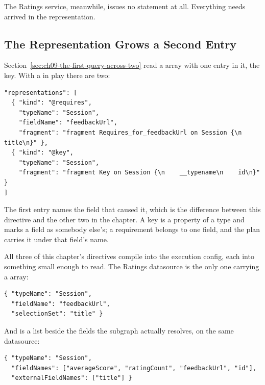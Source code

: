 %
The Ratings service, meanwhile, issues no statement at all. Everything
 needs arrived in the representation.

\subsection{The Representation Grows a Second Entry}

%
Section~\ref{sec:ch09-the-first-query-across-two} read a
 array with one entry in it, the key. With a
 in play there are two:

\begin{verbatim}
"representations": [
  { "kind": "@requires",
    "typeName": "Session",
    "fieldName": "feedbackUrl",
    "fragment": "fragment Requires_for_feedbackUrl on Session {\n    title\n}" },
  { "kind": "@key",
    "typeName": "Session",
    "fragment": "fragment Key on Session {\n    __typename\n    id\n}" }
]
\end{verbatim}

%
The first entry names the field that caused it, which is the difference between
this directive and the other two in the chapter. A key is a property of a type
and  marks a field as somebody else's; a requirement belongs to
one field, and the plan carries it under that field's name.

%
All three of this chapter's directives compile into the execution config, each
into something small enough to read. The Ratings datasource is the only one
carrying a  array:

\begin{verbatim}
{ "typeName": "Session",
  "fieldName": "feedbackUrl",
  "selectionSet": "title" }
\end{verbatim}

%
And  is a list beside the fields the subgraph actually
resolves, on the same datasource:

\begin{verbatim}
{ "typeName": "Session",
  "fieldNames": ["averageScore", "ratingCount", "feedbackUrl", "id"],
  "externalFieldNames": ["title"] }
\end{verbatim}

